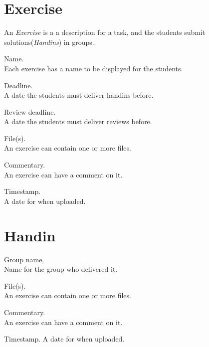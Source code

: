 \documentclass[Main]{subfiles}
\begin{document}

\section{Exercise}\label{sec:exercise}
An \textit{Exercise} is a a description for a task, and the students submit solutions(\textit{Handins}) in groups.
\begin{DataIntro}
\end{DataIntro}

\newpage
\begin{DataTable}

\Record
{Name. \\
Each exercise has a name to be displayed for the students.}
{}
{}

\Record
{Deadline. \\
A date the students must deliver handins before.}
{}
{}

\Record
{Review deadline. \\
A date the students must deliver reviews before.}
{}
{}

\Record
{File(s). \\
An exercise can contain one or more files.}
{}
{}


\Record
{Commentary. \\
An exercise can have a comment on it.}
{}
{}


\Record
{Timestamp. \\
A date for when uploaded.}
{}
{}
\end{DataTable}





\section{Handin}

	
\begin{DataIntro}
\end{DataIntro}

\begin{DataTable}

\Record
{Group name, \\
Name for the group who delivered it.}
{}
{}

\Record
{File(s). \\
An exercise can contain one or more files.}
{}
{}


\Record
{Commentary. \\
An exercise can have a comment on it.}
{}
{}


\Record
{Timestamp.}
{A date for when uploaded.}
{}
\end{DataTable}
\end{document}
